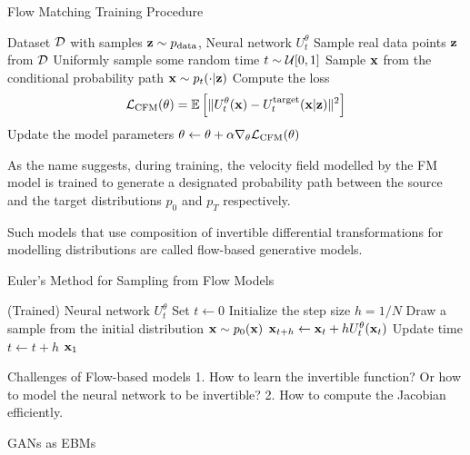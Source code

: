 \documentclass[a4paper, 11pt]{article}
\begin{document}
\begin{algorithm}
    \caption{Flow Matching Training Procedure}\label{alg:fm_train}
    \begin{algorithmic}[1]
    \Require Dataset $\mbox{${\cal D}$}$ with samples $\mbox{$\mbox{$\mathbf{z}$}$} \sim p_{\text{data}}$, Neural network $U_t^{\theta}$
    \State Sample real data points $\mbox{$\mbox{$\mathbf{z}$}$}$ from $\mbox{${\cal D}$}$
    \State Uniformly sample some random time $t \sim \mbox{${\cal U}$}[0, 1]$
    \State Sample $\mbox{$\mbox{$\mathbf{x}$}$}$ from the conditional probability path $\mbox{$\mbox{$\mathbf{x}$}$} \sim p_t(\cdot | \mbox{$\mbox{$\mathbf{z}$}$})$
    \State Compute the loss
    \begin{align*}
        \mbox{${\cal L}$}_{\text{CFM}}(\theta) = \mathbb{E} \left [ \|U_t^{\theta}(\mbox{$\mbox{$\mathbf{x}$}$}) - U_t^{\text{target}}(\mbox{$\mbox{$\mathbf{x}$}$} | \mbox{$\mbox{$\mathbf{z}$}$}) \|^2 \right ]
    \end{align*}
    \State Update the model parameters $\theta \gets \theta + \alpha \nabla_{\theta} \mbox{${\cal L}$}_{\text{CFM}}(\theta)$
    \EndWhile
    \end{algorithmic}
\end{algorithm}
    


As the name suggests, during training, the velocity field modelled by the FM model is trained to generate a designated probability path between the source and the target distributions $p_0$ and $p_T$ respectively.


Such models that use composition of invertible differential transformations for modelling distributions are called flow-based generative models.


\begin{algorithm}
    \caption{Euler's Method for Sampling from Flow Models}\label{alg:fm_sample}
    \begin{algorithmic}[1]
    \Require (Trained) Neural network $U_t^{\theta}$
    \State Set $t \gets 0$
    \State Initialize the step size $h = 1 / N$
    \State Draw a sample from the initial distribution $\mbox{$\mbox{$\mathbf{x}$}$} \sim p_0(\mbox{$\mbox{$\mathbf{x}$}$})$
    \State $\mbox{$\mbox{$\mathbf{x}$}$}_{t+h} \gets \mbox{$\mbox{$\mathbf{x}$}$}_t + h U_t^{\theta}(\mbox{$\mbox{$\mathbf{x}$}$}_t)$
    \State Update time $t \gets t + h$
    \EndFor
    \State \Return $\mbox{$\mbox{$\mathbf{x}$}$}_1$
    \end{algorithmic}
\end{algorithm}


Challenges of Flow-based models 1. How to learn the invertible function? Or how to model the neural network to be invertible? 2. How to compute the Jacobian efficiently.


GANs as EBMs
\end{document}
